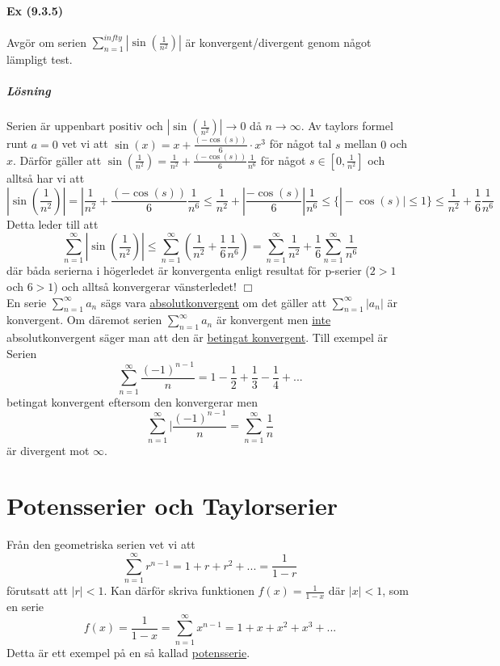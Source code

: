\paragraph{Ex (9.3.5)} Avgör om serien $\sum_{n=1}^{infty}|\sin(\frac{1}{n^2})|$ är konvergent/divergent genom något lämpligt test.
\subparagraph*{Lösning}
Serien är uppenbart positiv och $|\sin(\frac{1}{n^2})|\to 0$ då $n\to\infty$.
Av taylors formel runt $a=0$ vet vi att $\sin(x)=x+\frac{(-\cos(s))}{6}\cdot x^3$ för något tal $s$ mellan $0$ och $x$.
Därför gäller att $\sin(\frac{1}{n^2})=\frac{1}{n^2}+\frac{(-\cos(s))}{6}\frac{1}{n^6}$ för något $s\in[0,\frac{1}{n^2}]$ och alltså har vi att
\begin{equation*}
    |\sin(\frac{1}{n^2})|=
    |\frac{1}{n^2}+\frac{(-\cos(s))}{6}\frac{1}{n^6}\leq
    \frac{1}{n^2}+|\frac{-\cos(s)}{6}|\frac{1}{n^6}\leq
    \{ | -\cos(s)|\leq 1\}\leq
    \frac{1}{n^2}+\frac{1}{6}\frac{1}{n^6}
\end{equation*}
Detta leder till att
\begin{equation*}
    \sum_{n=1}^\infty|\sin(\frac{1}{n^2})|\leq
    \sum_{n=1}^\infty(\frac{1}{n^2}+\frac{1}{6}\frac{1}{n^6})=
    \sum_{n=1}^\infty\frac{1}{n^2}+\frac{1}{6}\sum_{n=1}^\infty\frac{1}{n^6}
\end{equation*}
där båda serierna i högerledet är konvergenta enligt resultat för p-serier ($2>1$ och $6>1$) och alltså konvergerar vänsterledet! $\Box$
\\
En serie $\sum_{n=1}^\infty a_n$ sägs vara \underline{absolutkonvergent} om det gäller att $\sum_{n=1}^\infty |a_n|$ är konvergent.
Om däremot serien $\sum_{n=1}^\infty a_n$ är konvergent men \underline{inte} absolutkonvergent säger man att den är \underline{betingat konvergent}.
Till exempel är Serien
\begin{equation*}
    \sum_{n=1}^\infty\frac{(-1)^{n-1}}{n}=
    1-\frac{1}{2}+\frac{1}{3}-\frac{1}{4}+...
\end{equation*}
betingat konvergent eftersom den konvergerar men
\begin{equation*}
    \sum_{n=1}^\infty|\frac{(-1)^{n-1}}{n}=\sum_{n=1}^\infty\frac{1}{n}
\end{equation*}
är divergent mot $\infty$.

\section{Potensserier och Taylorserier}
Från den geometriska serien vet vi att
\begin{equation*}
    \sum_{n=1}^\infty r^{n-1}=
    1+r+r^2+...=
    \frac{1}{1-r}
\end{equation*}
förutsatt att $|r|<1$.
Kan därför skriva funktionen $f(x)=\frac{1}{1-x}$ där $|x|<1$, som en serie
\begin{equation*}
    f(x)=\frac{1}{1-x}=\sum_{n=1}^\infty x^{n-1}=1+x+x^2+x^3+...
\end{equation*}
Detta är ett exempel på en så kallad \underline{potensserie}.

